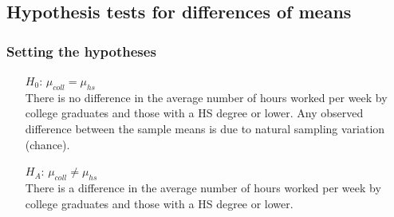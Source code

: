 
\subsection{Hypothesis tests for differences of means}


\begin{frame}
\frametitle{Setting the hypotheses}


\pause

\begin{itemize}
\item[$H_0$:] $\mu_{coll} = \mu_{hs}$  \\
{\small There is no difference in the average number of hours worked per week by college graduates and those with a HS degree or lower. Any observed difference between the sample means is due to natural sampling variation (chance).}
\pause
\item[$H_A$:] $\mu_{coll} \neq \mu_{hs}$  \\
{\small There is a difference in the average number of hours worked per week by college graduates and those with a HS degree or lower.}
\end{itemize}

\end{frame}


